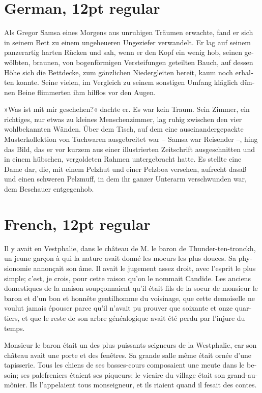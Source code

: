\documentclass[12pt]{book}
\newcommand{\germanfont}{\stdfont}
\newcommand{\germ}[1]{\textgerman{\germanfont#1}}
\begin{document}
\section*{German, 12pt regular}

\germ{Als Gregor Samsa eines Morgens aus unruhigen Träumen erwachte,
  fand er sich in seinem Bett zu einem ungeheueren Ungeziefer
  verwandelt. Er lag auf seinem panzerartig harten Rücken und sah,
  wenn er den Kopf ein wenig hob, seinen gewölbten, braunen, von
  bogenförmigen Versteifungen geteilten Bauch, auf dessen Höhe sich
  die Bettdecke, zum gänzlichen Niedergleiten bereit, kaum noch
  erhalten konnte. Seine vielen, im Vergleich zu seinem sonstigen
  Umfang kläglich dünnen Beine flimmerten ihm hilflos vor den Augen.}

\germ{»Was ist mit mir geschehen?« dachte er. Es war kein Traum. Sein
Zimmer, ein richtiges, nur etwas zu kleines Menschenzimmer, lag ruhig
zwischen den vier wohlbekannten Wänden. Über dem Tisch, auf dem eine
auseinandergepackte Musterkollektion von Tuchwaren ausgebreitet war –
Samsa war Reisender –, hing das Bild, das er vor kurzem aus einer
illustrierten Zeitschrift ausgeschnitten und in einem hübschen,
vergoldeten Rahmen untergebracht hatte. Es stellte eine Dame dar, die,
mit einem Pelzhut und einer Pelzboa versehen, aufrecht dasaß und einen
schweren Pelzmuff, in dem ihr ganzer Unterarm verschwunden war, dem
Beschauer entgegenhob.}

\section*{French, 12pt regular}

\textfrench{Il y avait en Vestphalie, dans le château de M. le baron de
Thunder-ten-tronckh, un jeune garçon à qui la nature avait donné les
moeurs les plus douces. Sa physionomie annonçait son âme. Il avait le
jugement assez droit, avec l’esprit le plus simple; c’est, je crois,
pour cette raison qu’on le nommait Candide. Les anciens domestiques de
la maison soupçonnaient qu’il était fils de la soeur de monsieur le
baron et d’un bon et honnête gentilhomme du voisinage, que cette
demoiselle ne voulut jamais épouser parce qu’il n’avait pu prouver que
soixante et onze quartiers, et que le reste de son arbre généalogique
avait été perdu par l’injure du temps.}

\textfrench{Monsieur le baron était un des plus puissants seigneurs de la
Westphalie, car son château avait une porte et des fenêtres. Sa grande
salle même était ornée d’une tapisserie. Tous les chiens de ses
basses-cours composaient une meute dans le besoin; ses palefreniers
étaient ses piqueurs; le vicaire du village était son
grand-aumônier. Ils l’appelaient tous monseigneur, et ils riaient
quand il fesait des contes.}
\end{document}
